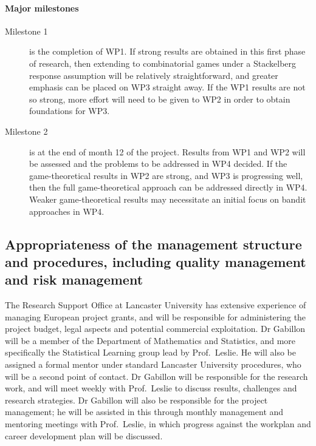 \documentclass[a4paper,11pt]{article}
\newcommand{\TODO}[1]{{\textcolor{red}{[\textbf{TODO:} #1]}}}
\begin{document}

\paragraph{Major milestones}
\begin{description}
\item[Milestone 1] is the completion of WP1. If strong results are obtained in this first phase of research, then extending to combinatorial games under a Stackelberg response assumption will be relatively straightforward, and greater emphasis can be placed on WP3 straight away.  If the WP1 results are not so strong, more effort will need to be given to WP2 in order to obtain foundations for WP3.
\item[Milestone 2] is at the end of month 12 of the project. Results from WP1 and WP2 will be assessed and the problems to be addressed in WP4 decided. If the game-theoretical results in WP2 are strong, and WP3 is progressing well, then the full game-theoretical approach can be addressed directly in WP4. Weaker game-theoretical results may necessitate an initial focus on bandit approaches in WP4.
\end{description}

\subsection{Appropriateness of the management structure and procedures, including quality management and risk management}


The Research Support Office at Lancaster University has extensive experience of managing European project grants, and will be responsible for administering the project budget, legal aspects and potential commercial exploitation.  Dr Gabillon will be a member of the Department of Mathematics and Statistics, and more specifically the Statistical Learning group lead by Prof.\ Leslie.  He will also be assigned a formal mentor under standard Lancaster University procedures, who will be a second point of contact.  Dr Gabillon will be responsible for the research work, and will meet weekly with Prof.\ Leslie to discuss results, challenges and research strategies.  Dr Gabillon will also be responsible for the project management; he will be assisted in this through monthly management and mentoring meetings with Prof.\ Leslie, in which progress against the workplan and career development plan will be discussed.
\end{document}
